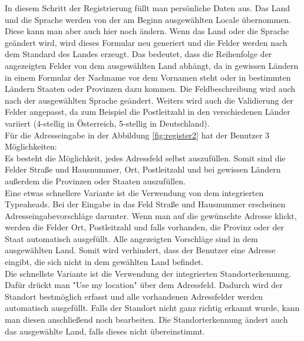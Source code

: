 In diesem Schritt der Registrierung füllt man persönliche Daten aus. Das Land und die Sprache werden von der am Beginn ausgewählten Locale übernommen. Diese kann man aber auch hier noch ändern. Wenn das Land oder die Sprache geändert wird, wird dieses Formular neu generiert und die Felder werden nach dem Standard des Landes erzeugt. Das bedeutet, dass die Reihenfolge der angezeigten Felder von dem ausgewählten Land abhängt, da in gewissen Ländern in einem Formular der Nachname vor dem Vornamen steht oder in bestimmten Ländern Staaten oder Provinzen dazu kommen. Die Feldbeschreibung wird auch nach der ausgewählten Sprache geändert. Weiters wird auch die Validierung der Felder angepasst, da zum Beispiel die Postleitzahl in den verschiedenen Länder variiert (4-stellig in Österreich, 5-stellig in Deutschland). \\
Für die Adresseingabe in der Abbildung \ref{fig:register2} hat der Benutzer 3 Möglichkeiten:\\
Es besteht die Möglichkeit, jedes Adressfeld selbst auszufüllen. Somit sind die Felder Straße und Hausnummer, Ort, Postleit\-zahl und bei gewissen Ländern außerdem die Provinzen oder Staaten auszufüllen.\\
Eine etwas schnellere Variante ist die Verwendung von dem integrierten Typeaheads. Bei der Eingabe in das Feld Straße und Hausnummer erscheinen Adresseingabevorschläge darunter. Wenn man auf die gewünschte Adresse klickt, werden die Felder Ort, Postleitzahl und falls vorhanden, die Provinz oder der Staat automatisch ausgefüllt. Alle angezeigten Vorschläge sind in dem ausgewählten Land. Somit wird verhindert, dass der Benutzer eine Adresse eingibt, die sich nicht in dem gewählten Land befindet.\\
Die schnellste Variante ist die Verwendung der integrierten Standorterkennung. Dafür drückt man "Use my location" über dem Adressfeld. Dadurch wird der Standort bestmöglich erfasst und alle vorhandenen Adressfelder werden automatisch ausgefüllt. Falls der Standort nicht ganz richtig erkannt wurde, kann man diesen anschließend noch bearbeiten. Die Standorterkennung ändert auch das ausgewählte Land, falls dieses nicht übereinstimmt.

